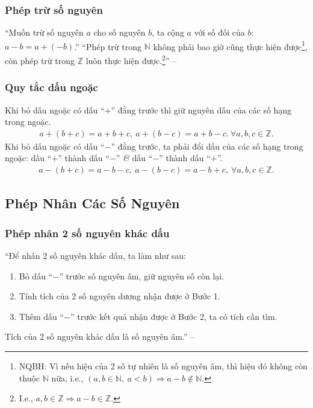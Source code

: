 \documentclass{article}
\numberwithin{equation}{section}
\begin{document}
\subsubsection{Phép trừ số nguyên}
``Muốn trừ số nguyên $a$ cho số nguyên $b$, ta cộng $a$ với số đối của $b$: $a - b = a + (-b)$.'' ``Phép trừ trong $\mathbb{N}$ không phải bao giờ cũng thực hiện được\footnote{NQBH: Vì nếu hiệu của 2 số tự nhiên là số nguyên âm, thì hiệu đó không còn thuộc $\mathbb{N}$ nữa, i.e., $(a,b\in\mathbb{N},\ a < b)\Rightarrow a - b\notin\mathbb{N}$.}, còn phép trừ trong $\mathbb{Z}$ luôn thực hiện được.\footnote{I.e., $a,b\in\mathbb{Z}\Rightarrow a - b\in\mathbb{Z}$.}'' -- \cite[p. 76]{SGK_Toan_6_Canh_Dieu_tap_1}

\subsubsection{Quy tắc dấu ngoặc}
Khi bỏ dấu ngoặc có dấu ``$+$'' đằng trước thì giữ nguyên dấu của các số hạng trong ngoặc.
\begin{align*}
	a + (b + c) = a + b + c,\ a + (b - c) = a + b - c.\ \forall a,b,c\in\mathbb{Z}.
\end{align*}
Khi bỏ dấu ngoặc có dấu ``$-$'' đằng trước, ta phải đổi dấu của các số hạng trong ngoặc: dấu ``$+$'' thành dấu ``$-$'' \textit{\&} dấu ``$-$'' thành dấu ``$+$''.
\begin{align*}
	a - (b + c) = a - b - c,\ a - (b - c) = a - b + c,\ \forall a,b,c\in\mathbb{Z}.
\end{align*}


\subsection{Phép Nhân Các Số Nguyên}

\subsubsection{Phép nhân 2 số nguyên khác dấu}
``Để nhân 2 số nguyên khác dấu, ta làm như sau:
\begin{enumerate}
	\item Bỏ dấu ``$-$'' trước số nguyên âm, giữ nguyên số còn lại.
	\item Tính tích của 2 số nguyên dương nhận được ở Bước 1.
	\item Thêm dấu ``$-$'' trước kết quả nhận được ở Bước 2, ta có tích cần tìm.
\end{enumerate}
Tích của 2 số nguyên khác dấu là số nguyên âm.'' -- \cite[p. 80]{SGK_Toan_6_Canh_Dieu_tap_1}
\end{document}
